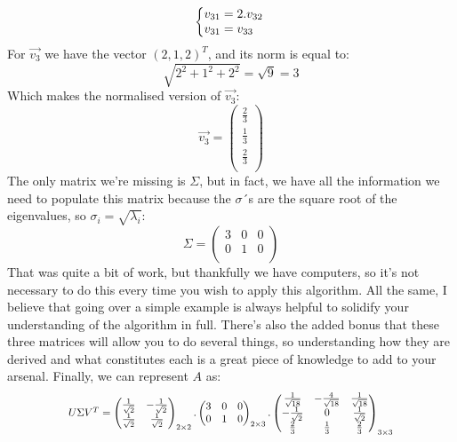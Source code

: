 \documentclass[600paper, 11pt,twoside,openany]{kdp}
\begin{document}
\[\left\{\begin{array}{@{}l@{}}
   v_{31} = 2.v_{32} \\
   v_{31} = v_{33} \\
  \end{array}\right.\,\]
\indent For $\overrightarrow{v_3}$ we have the vector $(2,1,2)^T$, and its norm is equal to:
\[\sqrt{2^2 + 1^2 + 2^2} = \sqrt{9} = 3\]
\indent Which makes the normalised version of $\overrightarrow{v_3}$:
\[
\overrightarrow{v_3} = \begin{pmatrix}
\frac{2}{3}\\
\frac{1}{3}\\
\frac{2}{3}\\
\end{pmatrix}
\]
\indent The only matrix we’re missing is $\Sigma$, but in fact, we have all the information we need to populate this matrix because the $\sigma$´s are the square root of the eigenvalues, so $\sigma_i = \sqrt{\lambda_i}$:
\[
\Sigma = \begin{pmatrix}
3 & 0 & 0\\
0 & 1 & 0 \\
\end{pmatrix}
\]
\indent That was quite a bit of work, but thankfully we have computers, so it’s not necessary to do this every time you wish to apply this algorithm. All the same, I believe that going over a simple example is always helpful to solidify  your understanding of the algorithm in full. There’s also the added bonus that these three matrices will allow you to do several things, so understanding  how they are derived and what constitutes each is a great piece of knowledge to add to your arsenal. Finally, we can represent $A$ as:
\[\scalebox{.85}{$U \Sigma V^T = \begin{pmatrix}
\frac{1}{\sqrt{2}} & -\frac{1}{\sqrt{2}} \\
\frac{1}{\sqrt{2}} & \frac{1}{\sqrt{2}}
\end{pmatrix}_{2 \times 2}.\begin{pmatrix}
3 & 0 & 0\\
0 & 1 & 0 \\
\end{pmatrix}_{2\times 3}.
\begin{pmatrix}
\frac{1}{\sqrt{18}} &-\frac{4}{\sqrt{18}} & \frac{1}{\sqrt{18}}\\
 -\frac{1}{\sqrt{2}}   & 0 & \frac{1}{\sqrt{2}} \\
 \frac{2}{3} &\frac{1}{3} & \frac{2}{3}\\
\end{pmatrix}_{3 \times 3}$}
\]
\end{document}

